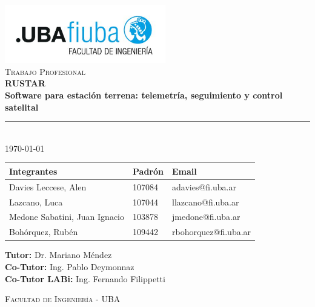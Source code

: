 \begin{titlepage}
\begin{center}

\includegraphics[width=7cm]{./images/fiuba_logo.jpg} \\[2cm]

\textsc{\Large Trabajo Profesional} \\[0.5cm]
{\huge \bfseries RUSTAR \\[0.3cm]
Software para estación terrena: telemetría, seguimiento y control satelital} \\[1cm]

\rule{\linewidth}{0.4pt} \\[1cm]

{\large \today} \\[2cm]

\hspace*{-1.5cm}
\begin{tabular}{ | l | l | l | }
    \hline
    \textbf{Integrantes} & \textbf{Padrón} & \textbf{Email} \\ \hline
    Davies Leccese, Alen & 107084 & adavies@fi.uba.ar \\ \hline
    Lazcano, Luca & 107044 & llazcano@fi.uba.ar \\ \hline
    Medone Sabatini, Juan Ignacio & 103878 & jmedone@fi.uba.ar \\ \hline
    Bohórquez, Rubén & 109442 & rbohorquez@fi.uba.ar \\ \hline
\end{tabular}

\vspace{1cm}

\textbf{Tutor:} Dr. Mariano Méndez\\[0.2cm]
\textbf{Co-Tutor:} Ing. Pablo Deymonnaz\\[0.2cm]
\textbf{Co-Tutor LABi:} Ing. Fernando Filippetti

\vfill

\textsc{Facultad de Ingeniería - UBA}

\end{center}
\end{titlepage}